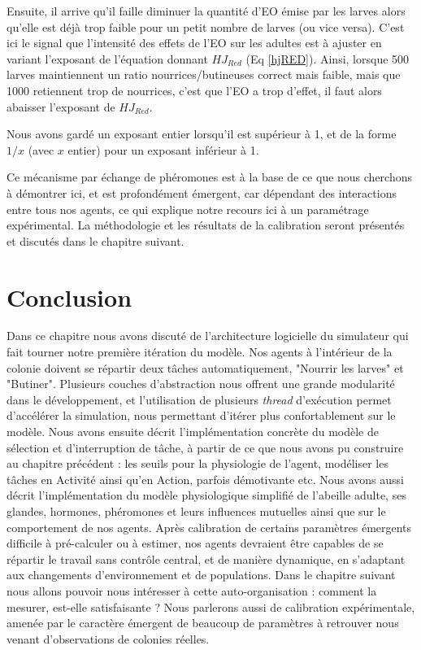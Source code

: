 	Ensuite, il arrive qu'il faille diminuer la quantité d'EO émise par les larves alors qu'elle est déjà trop faible pour un petit nombre de larves (ou vice versa). C'est ici le signal que l'intensité des effets de l'EO sur les adultes est à ajuster en variant l'exposant de l'équation donnant $HJ_{Red}$ (Eq \ref{hjRED}). Ainsi, lorsque 500 larves maintiennent un ratio nourrices/butineuses correct mais faible, mais que 1000 retiennent trop de nourrices, c'est que l'EO a trop d'effet, il faut alors abaisser l'exposant de $HJ_{Red}$. 
	
	Nous avons gardé un exposant entier lorsqu'il est supérieur à 1, et de la forme $1/x$ (avec $x$ entier) pour un exposant inférieur à 1.
	
	
	Ce mécanisme par échange de phéromones est à la base de ce que nous cherchons à démontrer ici, et est profondément émergent, car dépendant des interactions entre tous nos agents, ce qui explique notre recours ici à un paramétrage expérimental. La méthodologie et les résultats de la calibration seront présentés et discutés dans le chapitre suivant.
			
	\section*{Conclusion}
		Dans ce chapitre nous avons discuté de l'architecture logicielle du simulateur qui fait tourner notre première itération du modèle. Nos agents à l'intérieur de la colonie doivent se répartir deux tâches automatiquement, "Nourrir les larves" et "Butiner". Plusieurs couches d'abstraction nous offrent une grande modularité dans le développement, et l'utilisation de plusieurs \textit{thread} d'exécution permet d'accélérer la simulation, nous permettant d'itérer plus confortablement sur le modèle. Nous avons ensuite décrit l'implémentation concrète du modèle de sélection et d'interruption de tâche, à partir de ce que nous avons pu construire au chapitre précédent : les seuils pour la physiologie de l'agent, modéliser les tâches en Activité ainsi qu'en Action, parfois démotivante etc. Nous avons aussi décrit l'implémentation du modèle physiologique simplifié de l'abeille adulte, ses glandes, hormones, phéromones et leurs influences mutuelles ainsi que sur le comportement de nos agents. Après calibration de certains paramètres émergents difficile à pré-calculer ou à estimer, nos agents devraient être capables de se répartir le travail sans contrôle central, et de manière dynamique, en s'adaptant aux changements d'environnement et de populations. Dans le chapitre suivant nous allons pouvoir nous intéresser à cette auto-organisation : comment la mesurer, est-elle satisfaisante ? Nous parlerons aussi de calibration expérimentale, amenée par le caractère émergent de beaucoup de paramètres à retrouver nous venant d'observations de colonies réelles.
		
		
		
		
		
		
		
		
		
		
		
		
		
		
		
		
		
		
		
		
		
		
		
		
	